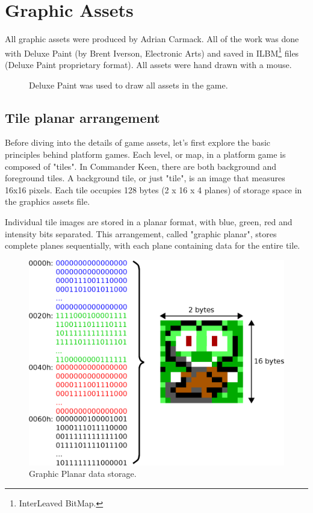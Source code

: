 \documentclass[book.tex]{subfiles}
\begin{document}
\section{Graphic Assets}
\label{section:graphic_assets}

All graphic assets were produced by Adrian Carmack. All of the work was done with Deluxe Paint (by Brent Iverson, Electronic Arts) and saved in ILBM\footnote{InterLeaved BitMap.} files (Deluxe Paint proprietary format). All assets were hand drawn with a mouse.

\begin{figure}[H]
  \centering
 \caption{Deluxe Paint was used to draw all assets in the game.}
\end{figure}

\subsection{Tile planar arrangement}
Before diving into the details of game assets, let's first explore the basic principles behind platform games. Each level, or map, in a platform game is composed of "tiles". In Commander Keen, there are both background and foreground tiles. A background tile, or just "tile", is an image that measures 16x16 pixels. Each tile occupies 128 bytes (2 x 16 x 4 planes) of storage space in the graphics assets file.\\

\par
Individual tile images are stored in a planar format, with blue, green, red and intensity bits separated. This arrangement, called "graphic planar", stores complete planes sequentially, with each plane containing data for the entire tile.\\

\par
\begin{figure}[H]
\centering
 \includegraphics[width=.8\textwidth]{imgs/drawings/Tile_RGBI.eps}
 \caption{Graphic Planar data storage.}
 \label{graphic_planar}
\end{figure}
\end{document}
